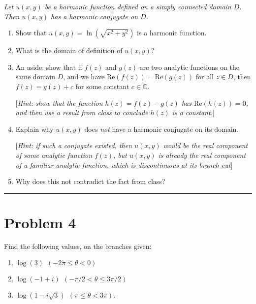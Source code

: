 \documentclass{article}
\begin{document}
\begin{center}
	{\em Let $u(x,y)$ be a harmonic function defined on a simply connected domain $D$. \\ Then $u(x,y)$ has a harmonic conjugate on $D$.}
\end{center}

\begin{enumerate}
	\item [(a)] Show that $u(x,y) = \ln(\sqrt{x^2 + y^2})$ is a harmonic function.

	\item [(b)] What is the domain of definition of $u(x,y)$?

	\item [(c)] An aside: show that if $f(z)$ and $g(z)$ are two analytic functions on the same domain $D$, and we have $\text{Re}(f(z)) = \text{Re}(g(z))$ for all $z \in D$, then $f(z) = g(z) + c$ for some constant $c \in \mathbb{C}$.

          [{\em Hint: show that the function $h(z) = f(z) - g(z)$ has $\text{Re}(h(z)) = 0$, and then use a result from class to conclude $h(z)$ is a constant.}]

	\item [(d)] Explain why $u(x,y)$ does {\it not} have a harmonic conjugate on its domain.

          [{\em Hint: if such a conjugate existed, then $u(x,y)$ would be the real component of some analytic function $f(z)$, but $u(x,y)$ is already the real component of a familiar analytic function, which is discontinuous at its branch cut}]

	\item Why does this not contradict the fact from class?
\end{enumerate}

\vspace{.5cm} %

\hrule

\newpage
\section*{Problem 4}
Find the following values, on the branches given:
\begin{enumerate}
	\item [(a)] $ \log(3) \ \ (-2\pi \leq \theta < 0)$
	\item [(b)] $ \log(-1 + i) \ \ (-\pi/2 < \theta \leq 3 \pi / 2)$
	\item [(c)] $ \log(1 - i \sqrt 3) \ \ (\pi \leq \theta < 3 \pi)$.
\end{enumerate}
\vspace{.5cm} %
\end{document}
